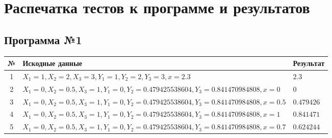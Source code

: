 \newpage
\section{Распечатка тестов к программе и результатов}

\subsection{Программа №1}
\begin{center}
    \begin{tabular}{|c|l|l|}
        \hline
        № & Искодные данные & Результат \\\hline
        1 &
        $X_1 = 1, X_2 = 2, X_3 = 3, Y_1 = 1, Y_2 = 2, Y_3 = 3, x
        = 2.3$ &
        $2.3$ \\\hline
        2 &
        $X_1 = 0, X_2 = 0.5, X_3 = 1, Y_1 = 0, Y_2 =
        0.479425538604, Y_3 = 0.841470984808, x = 0$ &
        $0$ \\\hline
        3 &
        $X_1 = 0, X_2 = 0.5, X_3 = 1, Y_1 = 0, Y_2 =
        0.479425538604, Y_3 = 0.841470984808, x = 0.5$ &
        $0.479426$ \\\hline
        4 &
        $X_1 = 0, X_2 = 0.5, X_3 = 1, Y_1 = 0, Y_2 =
        0.479425538604, Y_3 = 0.841470984808, x = 1$ &
        $0.841471$ \\\hline
        5 &
        $X_1 = 0, X_2 = 0.5, X_3 = 1, Y_1 = 0, Y_2 =
        0.479425538604, Y_3 = 0.841470984808, x = 0.7$ &
        $0.624244$ \\\hline
    \end{tabular}
\end{center}

